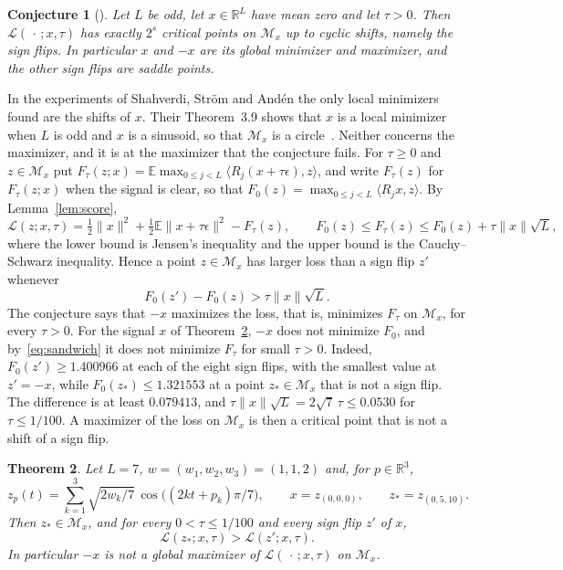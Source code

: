 \documentclass[11pt]{article}
\newtheorem{theorem}{Theorem}
\newtheorem{conjecture}[theorem]{Conjecture}
\theoremstyle{remark}
\newcommand{\E}{\mathbb{E}}
\newcommand{\R}{\mathbb{R}}
\begin{document}
\begin{conjecture}[{\cite[Conjecture~3.8]{SSA24}}]\label{conj}
Let $L$ be odd, let $x\in\R^L$ have mean zero and let $\tau>0$. Then $\mathcal L(\,\cdot\,;x,\tau)$ has exactly $2^{s}$ critical points on $\mathcal M_x$ up to cyclic shifts, namely the sign flips. In particular $x$ and $-x$ are its global minimizer and maximizer, and the other sign flips are saddle points.
\end{conjecture}

In the experiments of Shahverdi, Str\"om and And\'en the only local minimizers found are the shifts of $x$. Their Theorem~3.9 shows that $x$ is a local minimizer when $L$ is odd and $x$ is a sinusoid, so that $\mathcal M_x$ is a circle~\cite{SSA24}. Neither concerns the maximizer, and it is at the maximizer that the conjecture fails. For $\tau\ge0$ and $z\in\mathcal M_x$ put $F_\tau(z;x)=\E\max_{0\le j<L}\langle R_j(x+\tau\epsilon),z\rangle$, and write $F_\tau(z)$ for $F_\tau(z;x)$ when the signal is clear, so that $F_0(z)=\max_{0\le j<L}\langle R_jx,z\rangle$. By Lemma~\ref{lem:score},
\begin{equation}\label{eq:sandwich}
\mathcal L(z;x,\tau)=\tfrac12\|x\|^2+\tfrac12\E\|x+\tau\epsilon\|^2-F_\tau(z),\qquad F_0(z)\le F_\tau(z)\le F_0(z)+\tau\|x\|\sqrt L ,
\end{equation}
where the lower bound is Jensen's inequality and the upper bound is the Cauchy--Schwarz inequality. Hence a point $z\in\mathcal M_x$ has larger loss than a sign flip $z'$ whenever
\[
F_0(z')-F_0(z)>\tau\|x\|\sqrt L .
\]
The conjecture says that $-x$ maximizes the loss, that is, minimizes $F_\tau$ on $\mathcal M_x$, for every $\tau>0$. For the signal $x$ of Theorem~\ref{thm:main}, $-x$ does not minimize $F_0$, and by~\eqref{eq:sandwich} it does not minimize $F_\tau$ for small $\tau>0$. Indeed, $F_0(z')\ge1.400966$ at each of the eight sign flips, with the smallest value at $z'=-x$, while $F_0(z_*)\le1.321553$ at a point $z_*\in\mathcal M_x$ that is not a sign flip. The difference is at least $0.079413$, and $\tau\|x\|\sqrt L=2\sqrt7\,\tau\le0.0530$ for $\tau\le1/100$. A maximizer of the loss on $\mathcal M_x$ is then a critical point that is not a shift of a sign flip.

\begin{theorem}\label{thm:main}
Let $L=7$, $w=(w_1,w_2,w_3)=(1,1,2)$ and, for $p\in\R^3$,
\[
z_p(t)=\sum_{k=1}^3\sqrt{2w_k/7}\,\cos\bigl((2kt+p_k)\pi/7\bigr),\qquad x=z_{(0,0,0)},\qquad z_*=z_{(0,5,10)} .
\]
Then $z_*\in\mathcal M_x$, and for every $0<\tau\le 1/100$ and every sign flip $z'$ of $x$,
\[
\mathcal L(z_*;x,\tau)>\mathcal L(z';x,\tau).
\]
In particular $-x$ is not a global maximizer of $\mathcal L(\,\cdot\,;x,\tau)$ on $\mathcal M_x$.
\end{theorem}
\end{document}
